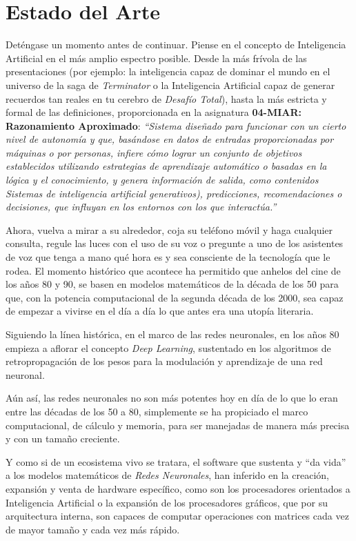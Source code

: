 
\cleardoublepage

\chapter{Estado del Arte}

Deténgase un momento antes de continuar. Piense en el concepto de Inteligencia Artificial en el más amplio espectro posible. Desde la más frívola de las presentaciones (por ejemplo: la inteligencia capaz de dominar el mundo en el universo de la saga de \emph{Terminator} o la Inteligencia Artificial capaz de generar recuerdos tan reales en tu cerebro de \emph{Desafío Total}), hasta la más estricta y formal de las definiciones, proporcionada en la asignatura \textbf{04-MIAR: Razonamiento Aproximado}:
\emph{``Sistema diseñado para funcionar con un cierto nivel de autonomía y que, basándose en datos de entradas proporcionadas por máquinas o por personas, infiere cómo lograr un conjunto de objetivos establecidos utilizando estrategias de aprendizaje automático o basadas en la lógica y el conocimiento, y genera información de salida, como contenidos Sistemas de inteligencia artificial generativos), predicciones, recomendaciones o decisiones, que influyan en los entornos con los que interactúa.''}

Ahora, vuelva a mirar a su alrededor, coja su teléfono móvil y haga cualquier consulta, regule las luces con el uso de su voz o pregunte a uno de los asistentes de voz que tenga a mano qué hora es y sea consciente de la tecnología que le rodea. El momento histórico que acontece ha permitido que anhelos del cine de los años 80 y 90, se basen en modelos matemáticos de la década de los 50 para que, con la potencia computacional de la segunda década de los 2000, sea capaz de empezar a vivirse en el día a día lo que antes era una utopía literaria.

Siguiendo la línea histórica, en el marco de las redes neuronales, en los años 80 empieza a aflorar el concepto \emph{Deep Learning}, sustentado en los algoritmos de retropropagación de los pesos para la modulación y aprendizaje de una red neuronal.

Aún así, las redes neuronales no son más potentes hoy en día de lo que lo eran entre las décadas de los 50 a 80, simplemente se ha propiciado el marco computacional, de cálculo y memoria, para ser manejadas de manera más precisa y con un tamaño creciente.

Y como si de un ecosistema vivo se tratara, el software que sustenta y ``da vida'' a los modelos matemáticos de \emph{Redes Neuronales}, han inferido en la creación, expansión y venta de hardware específico, como son los procesadores orientados a Inteligencia Artificial o la expansión de los procesadores gráficos, que por su arquitectura interna, son capaces de computar operaciones con matrices cada vez de mayor tamaño y cada vez más rápido.

